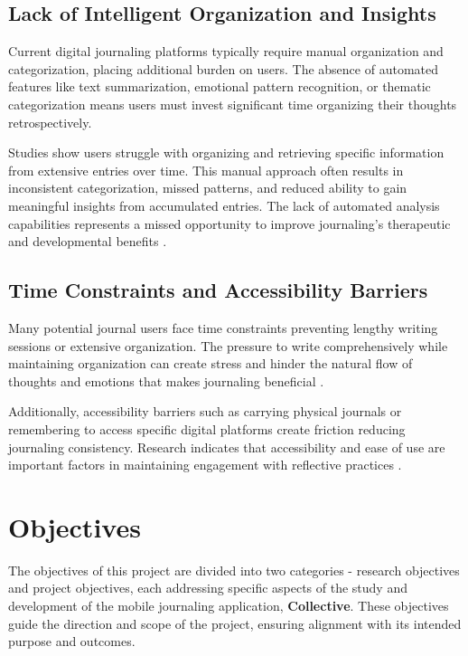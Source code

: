 \subsection{Lack of Intelligent Organization and Insights}\label{subsec:lack-intelligence}

Current digital journaling platforms typically require manual organization and categorization, placing additional burden on users. The absence of automated features like text summarization, emotional pattern recognition, or thematic categorization means users must invest significant time organizing their thoughts retrospectively.

Studies show users struggle with organizing and retrieving specific information from extensive entries over time. This manual approach often results in inconsistent categorization, missed patterns, and reduced ability to gain meaningful insights from accumulated entries. The lack of automated analysis capabilities represents a missed opportunity to improve journaling's therapeutic and developmental benefits \cite{allahyari2017text}.

\subsection{Time Constraints and Accessibility Barriers}\label{subsec:time-constraints}

Many potential journal users face time constraints preventing lengthy writing sessions or extensive organization. The pressure to write comprehensively while maintaining organization can create stress and hinder the natural flow of thoughts and emotions that makes journaling beneficial \cite{pennebaker1999forming}.

Additionally, accessibility barriers such as carrying physical journals or remembering to access specific digital platforms create friction reducing journaling consistency. Research indicates that accessibility and ease of use are important factors in maintaining engagement with reflective practices \cite{pennebaker2011expressive}.

\section{Objectives}\label{sec:objectives}

The objectives of this project are divided into two categories - research objectives and project objectives, each addressing specific aspects of the study and development of the mobile journaling application, \textbf{Collective}. These objectives guide the direction and scope of the project, ensuring alignment with its intended purpose and outcomes.

